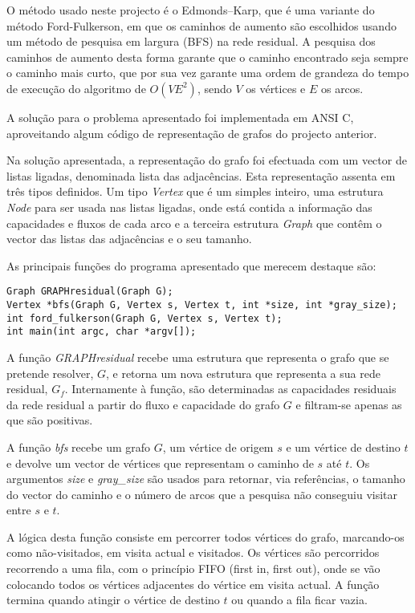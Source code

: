 \documentclass[12pt]{article}
\begin{document}
O método usado neste projecto é o Edmonds–Karp, que é uma variante do método Ford-Fulkerson, em que os caminhos de aumento são escolhidos usando um método de pesquisa em largura (BFS) na rede residual. A pesquisa dos caminhos de aumento desta forma garante que o caminho encontrado seja sempre o caminho mais curto, que por sua vez garante uma ordem de grandeza do tempo de execução do algoritmo de $O(VE^2)$, sendo $V$ os vértices e $E$ os arcos.


A solução para o problema apresentado foi implementada em ANSI C, aproveitando algum código de representação de grafos do projecto anterior. 

Na solução apresentada, a representação do grafo foi efectuada com um vector de listas ligadas, denominada lista das adjacências. Esta representação assenta em três tipos definidos. Um tipo \emph{Vertex} que é um simples inteiro, uma estrutura \emph{Node} para ser usada nas listas ligadas, onde está contida a informação das capacidades e fluxos de cada arco e a terceira estrutura \emph{Graph} que contêm o vector das listas das adjacências e o seu tamanho. 

As principais funções do programa apresentado que merecem destaque são: 

\begin{lstlisting}
Graph GRAPHresidual(Graph G);
Vertex *bfs(Graph G, Vertex s, Vertex t, int *size, int *gray_size);
int ford_fulkerson(Graph G, Vertex s, Vertex t);
int main(int argc, char *argv[]); 
\end{lstlisting}


A função \emph{GRAPHresidual} recebe uma estrutura que representa o grafo que se pretende resolver, $G$, e retorna um nova estrutura que representa a sua rede residual, $G_f$. Internamente à função, são determinadas as capacidades residuais da rede residual a partir do fluxo e capacidade do grafo $G$ e filtram-se apenas as que são positivas. 

A função \emph{bfs} recebe um grafo $G$, um vértice de origem $s$ e um vértice de destino $t$ e devolve um vector de vértices que representam o caminho de $s$ até $t$. Os argumentos \emph{size} e \emph{gray\_size} são usados para retornar, via referências, o tamanho do vector do caminho e o número de arcos que a pesquisa não conseguiu visitar entre $s$ e $t$.

A lógica desta função consiste em percorrer todos vértices do grafo, marcando-os como não-visitados, em visita actual e visitados. Os vértices são percorridos recorrendo a uma fila, com o princípio FIFO (first in, first out), onde se vão colocando todos os vértices adjacentes do vértice em visita actual. A função termina quando atingir o vértice de destino $t$ ou quando a fila ficar vazia.
\end{document}
